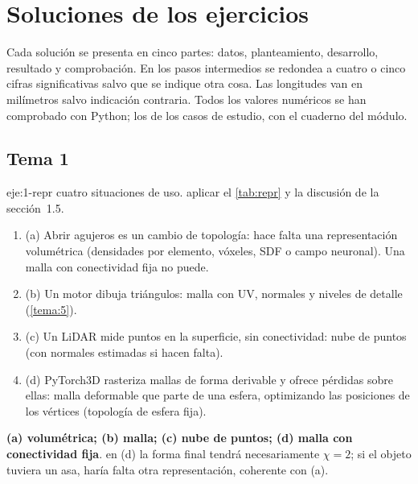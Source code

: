 \chapter{Soluciones de los ejercicios}
\label{ap:soluciones}

Cada solución se presenta en cinco partes: datos, planteamiento, desarrollo, resultado y comprobación. En los pasos intermedios se redondea a cuatro o cinco cifras significativas salvo que se indique otra cosa. Las longitudes van en milímetros salvo indicación contraria. Todos los valores numéricos se han comprobado con Python; los de los casos de estudio, con el cuaderno del módulo.

\section{Tema 1}

\begin{solucion}{eje:1-repr}
\datos cuatro situaciones de uso.
\planteamiento aplicar el \cref{tab:repr} y la discusión de la sección~1.5.
\pasos
\begin{enumerate}[label=\arabic*.]
  \item (a) Abrir agujeros es un cambio de topología: hace falta una representación volumétrica (densidades por elemento, vóxeles, SDF o campo neuronal). Una malla con conectividad fija no puede.
  \item (b) Un motor dibuja triángulos: malla con UV, normales y niveles de detalle (\cref{tema:5}).
  \item (c) Un LiDAR mide puntos en la superficie, sin conectividad: nube de puntos (con normales estimadas si hacen falta).
  \item (d) PyTorch3D rasteriza mallas de forma derivable y ofrece pérdidas sobre ellas: malla deformable que parte de una esfera, optimizando las posiciones de los vértices (topología de esfera fija).
\end{enumerate}
\resultado \textbf{(a) volumétrica; (b) malla; (c) nube de puntos; (d) malla con conectividad fija}.
\comprobacion en (d) la forma final tendrá necesariamente $\chi=2$; si el objeto tuviera un asa, haría falta otra representación, coherente con (a).
\end{solucion}

